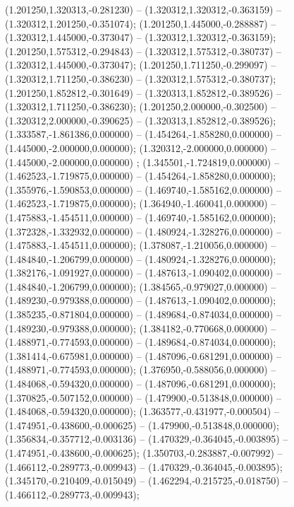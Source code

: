  (1.201250,1.320313,-0.281230) -- (1.320312,1.320312,-0.363159) -- (1.320312,1.201250,-0.351074);
 (1.201250,1.445000,-0.288887) -- (1.320312,1.445000,-0.373047) -- (1.320312,1.320312,-0.363159);
 (1.201250,1.575312,-0.294843) -- (1.320312,1.575312,-0.380737) -- (1.320312,1.445000,-0.373047);
 (1.201250,1.711250,-0.299097) -- (1.320312,1.711250,-0.386230) -- (1.320312,1.575312,-0.380737);
 (1.201250,1.852812,-0.301649) -- (1.320313,1.852812,-0.389526) -- (1.320312,1.711250,-0.386230);
 (1.201250,2.000000,-0.302500) -- (1.320312,2.000000,-0.390625) -- (1.320313,1.852812,-0.389526);
 (1.333587,-1.861386,0.000000) -- (1.454264,-1.858280,0.000000) -- (1.445000,-2.000000,0.000000);
 (1.320312,-2.000000,0.000000) -- (1.445000,-2.000000,0.000000) ;
 (1.345501,-1.724819,0.000000) -- (1.462523,-1.719875,0.000000) -- (1.454264,-1.858280,0.000000);
 (1.355976,-1.590853,0.000000) -- (1.469740,-1.585162,0.000000) -- (1.462523,-1.719875,0.000000);
 (1.364940,-1.460041,0.000000) -- (1.475883,-1.454511,0.000000) -- (1.469740,-1.585162,0.000000);
 (1.372328,-1.332932,0.000000) -- (1.480924,-1.328276,0.000000) -- (1.475883,-1.454511,0.000000);
 (1.378087,-1.210056,0.000000) -- (1.484840,-1.206799,0.000000) -- (1.480924,-1.328276,0.000000);
 (1.382176,-1.091927,0.000000) -- (1.487613,-1.090402,0.000000) -- (1.484840,-1.206799,0.000000);
 (1.384565,-0.979027,0.000000) -- (1.489230,-0.979388,0.000000) -- (1.487613,-1.090402,0.000000);
 (1.385235,-0.871804,0.000000) -- (1.489684,-0.874034,0.000000) -- (1.489230,-0.979388,0.000000);
 (1.384182,-0.770668,0.000000) -- (1.488971,-0.774593,0.000000) -- (1.489684,-0.874034,0.000000);
 (1.381414,-0.675981,0.000000) -- (1.487096,-0.681291,0.000000) -- (1.488971,-0.774593,0.000000);
 (1.376950,-0.588056,0.000000) -- (1.484068,-0.594320,0.000000) -- (1.487096,-0.681291,0.000000);
 (1.370825,-0.507152,0.000000) -- (1.479900,-0.513848,0.000000) -- (1.484068,-0.594320,0.000000);
 (1.363577,-0.431977,-0.000504) -- (1.474951,-0.438600,-0.000625) -- (1.479900,-0.513848,0.000000);
 (1.356834,-0.357712,-0.003136) -- (1.470329,-0.364045,-0.003895) -- (1.474951,-0.438600,-0.000625);
 (1.350703,-0.283887,-0.007992) -- (1.466112,-0.289773,-0.009943) -- (1.470329,-0.364045,-0.003895);
 (1.345170,-0.210409,-0.015049) -- (1.462294,-0.215725,-0.018750) -- (1.466112,-0.289773,-0.009943);
